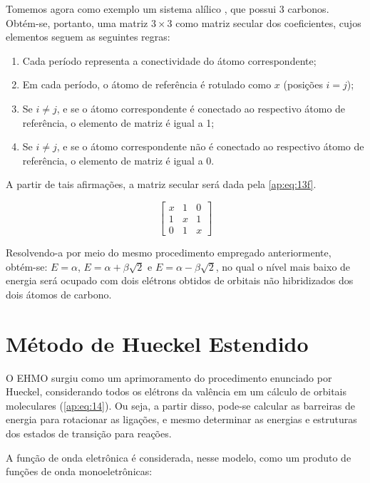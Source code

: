 Tomemos agora como exemplo um sistema alílico \ce{[CH_2=CH-CH_2-]}, que possui 3 carbonos. Obtém-se, portanto, uma matriz $3 \times 3$ como matriz secular dos coeficientes, cujos elementos seguem as seguintes regras:

\begin{enumerate}
    \item Cada período representa a conectividade do átomo correspondente;
    \item Em cada período, o átomo de referência é rotulado como $x$ (posições $i=j$);
    \item Se $i \neq j$, e se o átomo correspondente é conectado ao respectivo átomo de referência, o elemento de matriz é igual a 1;
    \item Se $i \neq j$, e se o átomo correspondente não é conectado ao respectivo átomo de referência, o elemento de matriz é igual a 0.
\end{enumerate}

\noindent A partir de tais afirmações, a matriz secular será dada pela \autoref{ap:eq:13f}.

\begin{equation}
\label{ap:eq:13f}
\begin{bmatrix}
    x & 1 & 0 \\
    1 & x & 1 \\
    0 & 1 & x 
\end{bmatrix}
\end{equation}

Resolvendo-a por meio do mesmo procedimento empregado anteriormente, obtém-se: $E = \alpha$, $E = \alpha + \beta \sqrt{2}$ e $E = \alpha - \beta \sqrt{2}$, no qual o nível mais baixo de energia será ocupado com dois elétrons obtidos de orbitais não hibridizados dos dois átomos de carbono.

\chapter{Método de Hueckel Estendido} \label{ap:EHMO}

O \gls{EHMO} surgiu como um aprimoramento do procedimento enunciado por Hueckel, considerando todos os elétrons da valência em um cálculo de orbitais moleculares (\autoref{ap:eq:14}). Ou seja, a partir disso, pode-se calcular as barreiras de energia para rotacionar as ligações, e mesmo determinar as energias e estruturas dos estados de transição para reações.

A função de onda eletrônica é considerada, nesse modelo, como um produto de funções de onda monoeletrônicas:

